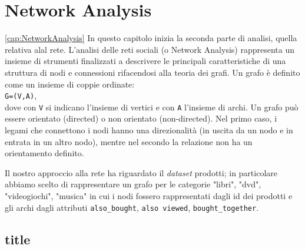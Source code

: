 \chapter{Network Analysis}
\ref{cap:NetworkAnalysis}
	In questo capitolo inizia la seconda parte di analisi, quella relativa alal rete. L’analisi delle reti sociali (o Network Analysis) rappresenta un insieme di strumenti finalizzati
	a descrivere le principali caratteristiche di una struttura di nodi e connessioni rifacendosi alla teoria dei grafi. Un grafo è definito come un insieme di coppie ordinate: \\
	\verb|G=(V,A)|, \\
	dove con \verb|V| si indicano l'insieme di vertici e con \verb|A| l'insieme di archi.	Un grafo può essere orientato (directed) o non orientato (non-directed). Nel primo caso, i	legami che connettono i nodi hanno una direzionalità (in uscita da un nodo e in entrata in un altro nodo), mentre nel secondo la relazione non ha un orientamento definito. 
	
	Il nostro approccio alla rete ha riguardato il \textit{dataset} prodotti; in particolare abbiamo scelto di rappresentare un grafo per le categorie "libri", "dvd", "videogiochi", "musica" in cui i nodi fossero rappresentati dagli id dei prodotti e gli archi dagli attributi \verb|also_bought|, \verb|also viewed|, \verb|bought_together|.
	
	\section{title}
		